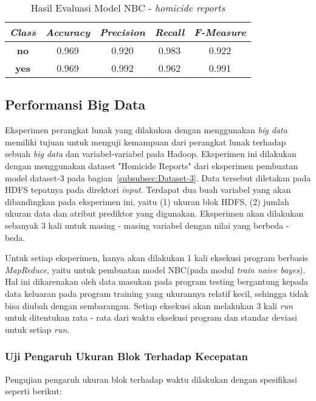 \begin{table}[H]
\label{tab:model evaluation - homicide}
\centering
\caption{Hasil Evaluasi Model NBC - \textit{homicide reports}}
\begin{tabular}{ | c | c | c | c | c | }
\hline
\textit{\textbf{Class}} & \textit{\textbf{Accuracy}} & \textit{\textbf{Precision}} & \textit{\textbf{Recall}} & \textit{\textbf{F-Measure}}\\ \hline \hline
\textbf{no} & 0.969 & 0.920 & 0.983 & 0.922 \\ \hline
\textbf{yes} & 0.969 & 0.992 & 0.962 & 0.991 \\ \hline
\end{tabular}
\end{table}

\subsection{Performansi Big Data}
Eksperimen perangkat lunak yang dilakukan dengan menggunakan \textit{big data} memiliki tujuan untuk menguji kemampuan dari perangkat lunak terhadap sebuah \textit{big data} dan variabel-variabel pada Hadoop. Eksperimen ini dilakukan dengan menggunakan dataset "Homicide Reports" dari eksperimen pembuatan model dataset-3 pada bagian~\ref{subsubsec:Dataset-3}. Data tersebut diletakan pada HDFS tepatnya pada direktori \textit{input}. Terdapat dua buah variabel yang akan dibandingkan pada eksperimen ini, yaitu (1) ukuran blok HDFS, (2) jumlah ukuran data dan atribut prediktor yang digunakan. Eksperimen akan dilakukan sebanyak 3 kali untuk masing - masing variabel dengan nilai yang berbeda - beda.

Untuk setiap eksperimen, hanya akan dilakukan 1 kali eksekusi program berbasis \textit{MapReduce}, yaitu untuk pembuatan model NBC(pada modul \textit{train naive bayes}). Hal ini dikarenakan oleh data masukan pada program testing bergantung kepada data keluaran pada program training yang ukurannya relatif kecil, sehingga tidak bisa diubah dengan sembarangan. Setiap eksekusi akan melakukan 3 kali \textit{run} untuk ditentukan rata - rata dari waktu eksekusi program dan standar deviasi untuk setiap \textit{run}.

\subsubsection{Uji Pengaruh Ukuran Blok Terhadap Kecepatan}

Pengujian pengaruh ukuran blok terhadap waktu dilakukan dengan spesifikasi seperti berikut:

